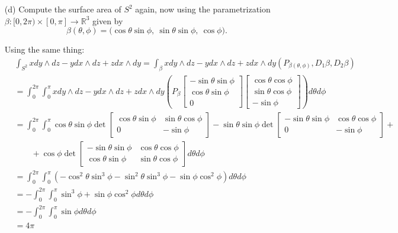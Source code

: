 \documentclass[11pt]{article}
\newcommand{\bbR}{\mathbb{R}}
\begin{document}
\begin{itemize}
\item[(d)] Compute the surface area of $S^2$ again, now using the parametrization
$\beta:[0,2\pi)\times[0,\pi]\rightarrow\bbR^3$ given by
\begin{equation*}
\beta(\theta,\phi)=\big(\cos\theta\sin\phi,\:\sin\theta\sin\phi,\:\cos\phi\big).
\end{equation*}
\begin{solution}
    Using the same thing:
    \begin{align*}
        &\int_{S^2} xdy\wedge dz - ydx\wedge dz + zdx \wedge dy= \int_{\beta} xdy\wedge dz - ydx\wedge dz + zdx \wedge dy\left(P_{\beta(\theta, \phi)}, D_1\beta, D_2 \beta\right)\\
        &= \int_0^{2\pi}\int_0^\pi xdy\wedge dz - ydx\wedge dz + zdx \wedge dy \left(P_{\beta} \begin{bmatrix}
            -\sin\theta\sin\phi\\
            \cos\theta\sin\phi\\
            0
        \end{bmatrix}\begin{bmatrix}
            \cos\theta\cos\phi\\
            \sin\theta\cos\phi\\
            -\sin\phi
        \end{bmatrix}\right)d\theta d\phi\\
        &= \int_0^{2\pi}\int_0^\pi \cos\theta\sin\phi\det 
        \begin{bmatrix}
            \cos\theta\sin\phi & \sin\theta\cos\phi\\
            0 & -\sin\phi
        \end{bmatrix} - \sin\theta\sin\phi\det
        \begin{bmatrix}
            -\sin\theta\sin\phi & \cos\theta\cos\phi\\
            0 & -\sin\phi
        \end{bmatrix} + 
        \\&\qquad + 
        \cos \phi\det
        \begin{bmatrix}
            -\sin\theta\sin\phi & \cos\theta\cos\phi\\
            \cos\theta\sin\phi & \sin\theta\cos\phi
        \end{bmatrix} d\theta d\phi\\
        &= \int_0^{2\pi}\int_0^\pi (-\cos^2\theta \sin^3\phi -  \sin^2\theta\sin^3\phi - \sin\phi\cos^2\phi) d\theta d\phi\\
        &= -\int_0^{2\pi}\int_0^\pi \sin^3\phi + \sin\phi\cos^2\phi d\theta d\phi\\
        &= -\int_0^{2\pi}\int_0^\pi \sin\phi d\theta d\phi\\
        &= 4\pi
    \end{align*}
\end{solution}
\end{itemize}
\end{document}
